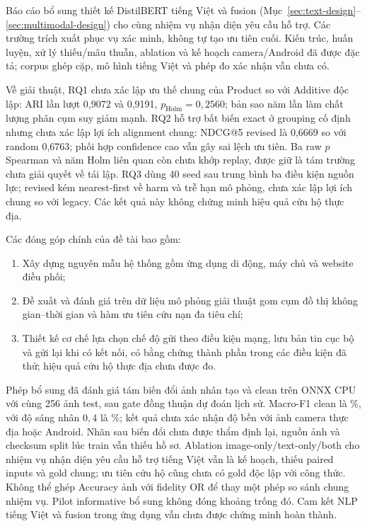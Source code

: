 Báo cáo bổ sung thiết kế DistilBERT tiếng Việt và fusion (Mục~\ref{sec:text-design}--\ref{sec:multimodal-design}) cho cùng nhiệm vụ nhận diện yêu cầu hỗ trợ. Các trường trích xuất phục vụ xác minh, không tự tạo ưu tiên cuối. Kiến trúc, huấn luyện, xử lý thiếu/mâu thuẫn, ablation và kế hoạch camera/Android đã được đặc tả; corpus ghép cặp, mô hình tiếng Việt và phép đo xác nhận vẫn chưa có.

Về giải thuật, RQ1 chưa xác lập ưu thế chung của Product so với Additive độc lập: ARI lần lượt 0,9072 và 0,9191, $p_{\mathrm{Holm}}=0{,}2560$; bản sao năm lần làm chất lượng phân cụm suy giảm mạnh. RQ2 hỗ trợ bất biến exact ở grouping cố định nhưng chưa xác lập lợi ích alignment chung: NDCG@5 revised là 0,6669 so với random 0,6763; phối hợp confidence cao vẫn gây sai lệch ưu tiên. Ba raw $p$ Spearman và năm Holm liên quan còn chưa khớp replay, được giữ là tám trường chưa giải quyết về tái lập. RQ3 dùng 40 seed sau trung bình ba điều kiện nguồn lực; revised kém nearest-first về harm và trễ hạn mô phỏng, chưa xác lập lợi ích chung so với legacy. Các kết quả này không chứng minh hiệu quả cứu hộ thực địa.

Các đóng góp chính của đề tài bao gồm:
\begin{enumerate}
\item Xây dựng nguyên mẫu hệ thống gồm ứng dụng di động, máy chủ và website điều phối;
\item Đề xuất và đánh giá trên dữ liệu mô phỏng giải thuật gom cụm đồ thị không gian--thời gian và hàm ưu tiên cứu nạn đa tiêu chí;
\item Thiết kế cơ chế lựa chọn chế độ gửi theo điều kiện mạng, lưu bản tin cục bộ và gửi lại khi có kết nối, có bằng chứng thành phần trong các điều kiện đã thử; hiệu quả cứu hộ thực địa chưa được đo.
\end{enumerate}

Phép bổ sung đã đánh giá tám biến đổi ảnh nhân tạo và clean trên ONNX CPU với cùng 256 ảnh test, sau gate đồng thuận dự đoán lịch sử. Macro-F1 clean là \QualityCleanMacroFOne\%, với độ sáng nhân $0{,}4$ là \QualityDarkMacroFOne\%; kết quả chưa xác nhận độ bền với ảnh camera thực địa hoặc Android. Nhãn sau biến đổi chưa được thẩm định lại, nguồn ảnh và checksum split lúc train vẫn thiếu hồ sơ. Ablation image-only/text-only/both cho nhiệm vụ nhận diện yêu cầu hỗ trợ tiếng Việt vẫn là kế hoạch, thiếu paired inputs và gold chung; ưu tiên cứu hộ cũng chưa có gold độc lập với công thức. Không thể ghép Accuracy ảnh với fidelity OR để thay một phép so sánh chung nhiệm vụ. Pilot informative bổ sung không đóng khoảng trống đó. Cam kết NLP tiếng Việt và fusion trong ứng dụng vẫn chưa được chứng minh hoàn thành.


